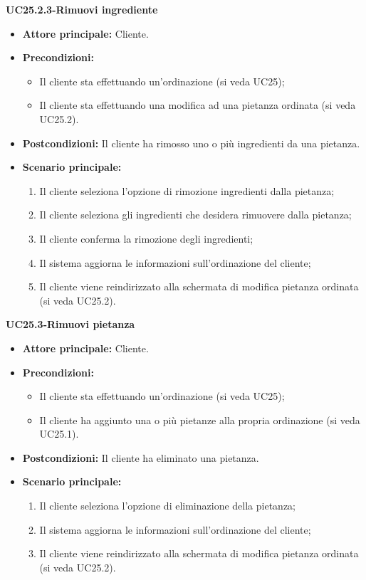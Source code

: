 \textbf{UC25.2.3-Rimuovi ingrediente}
\begin{itemize}
\item \textbf{Attore principale:} Cliente.
\item \textbf{Precondizioni:} 
\begin{itemize}
    \item Il cliente sta effettuando un'ordinazione (si veda UC25);
    \item Il cliente sta effettuando una modifica ad una pietanza ordinata (si veda UC25.2).
\end{itemize}
\item \textbf{Postcondizioni:} Il cliente ha rimosso uno o più ingredienti da una pietanza.
\item \textbf{Scenario principale:}
\begin{enumerate}
    \item Il cliente seleziona l'opzione di rimozione ingredienti dalla pietanza;
    \item Il cliente seleziona gli ingredienti che desidera rimuovere dalla pietanza;
    \item Il cliente conferma la rimozione degli ingredienti;
    \item Il sistema aggiorna le informazioni sull'ordinazione del cliente;
    \item Il cliente viene reindirizzato alla schermata di modifica pietanza ordinata (si veda UC25.2).
\end{enumerate}
\end{itemize}

\textbf{UC25.3-Rimuovi pietanza}
\begin{itemize}
\item \textbf{Attore principale:} Cliente.
\item \textbf{Precondizioni:} 
\begin{itemize}
    \item Il cliente sta effettuando un'ordinazione (si veda UC25);
    \item Il cliente ha aggiunto una o più pietanze alla propria ordinazione (si veda UC25.1).
\end{itemize}
\item \textbf{Postcondizioni:} Il cliente ha eliminato una pietanza.
\item \textbf{Scenario principale:}
\begin{enumerate}
    \item Il cliente seleziona l'opzione di eliminazione della pietanza;
    \item Il sistema aggiorna le informazioni sull'ordinazione del cliente;
    \item Il cliente viene reindirizzato alla schermata di modifica pietanza ordinata (si veda UC25.2).
\end{enumerate}
\end{itemize}

